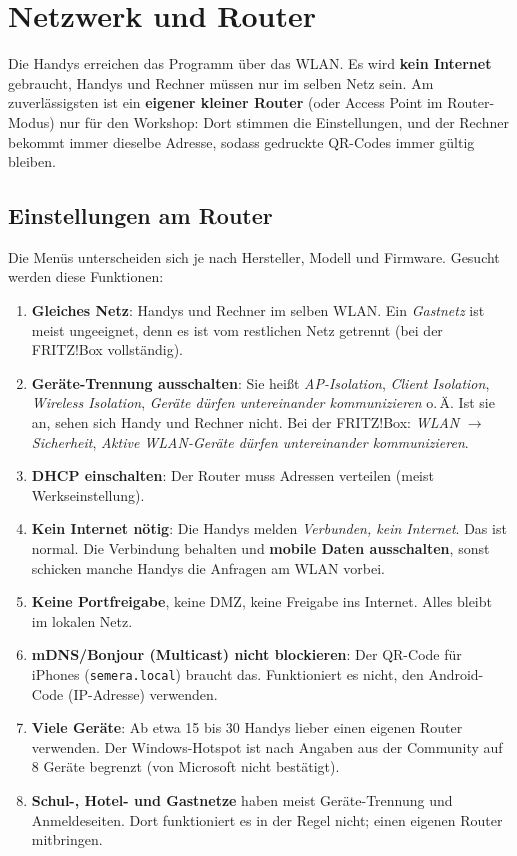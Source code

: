 \documentclass[a4paper,11pt]{article}
\newcommand{\pfeil}{\ensuremath{\rightarrow}}
\begin{document}
\section{Netzwerk und Router}\label{sec:netzwerk}

Die Handys erreichen das Programm über das WLAN. Es wird \textbf{kein Internet} gebraucht, Handys und Rechner müssen nur
im selben Netz sein. Am zuverlässigsten ist ein \textbf{eigener kleiner Router} (oder Access Point im Router-Modus) nur für
den Workshop: Dort stimmen die Einstellungen, und der Rechner bekommt immer dieselbe Adresse, sodass gedruckte
QR-Codes immer gültig bleiben.

\subsection{Einstellungen am Router}

Die Menüs unterscheiden sich je nach Hersteller, Modell und Firmware. Gesucht werden diese Funktionen:
\begin{enumerate}
  \item \textbf{Gleiches Netz}: Handys und Rechner im selben WLAN. Ein \emph{Gastnetz} ist meist ungeeignet, denn es ist
  vom restlichen Netz getrennt (bei der FRITZ!Box vollständig).
  \item \textbf{Geräte-Trennung ausschalten}: Sie heißt \emph{AP-Isolation}, \emph{Client Isolation}, \emph{Wireless
  Isolation}, \emph{Geräte dürfen untereinander kommunizieren} o.\,Ä. Ist sie an, sehen sich Handy und Rechner nicht. Bei
  der FRITZ!Box: \emph{WLAN} \pfeil{} \emph{Sicherheit}, \emph{Aktive WLAN-Geräte dürfen untereinander kommunizieren}.
  \item \textbf{DHCP einschalten}: Der Router muss Adressen verteilen (meist Werkseinstellung).
  \item \textbf{Kein Internet nötig}: Die Handys melden \emph{Verbunden, kein Internet}. Das ist normal. Die Verbindung
  behalten und \textbf{mobile Daten ausschalten}, sonst schicken manche Handys die Anfragen am WLAN vorbei.
  \item \textbf{Keine Portfreigabe}, keine DMZ, keine Freigabe ins Internet. Alles bleibt im lokalen Netz.
  \item \textbf{mDNS/Bonjour (Multicast) nicht blockieren}: Der QR-Code für iPhones (\texttt{semera.local}) braucht das.
  Funktioniert es nicht, den Android-Code (IP-Adresse) verwenden.
  \item \textbf{Viele Geräte}: Ab etwa 15 bis 30 Handys lieber einen eigenen Router verwenden. Der Windows-Hotspot ist
  nach Angaben aus der Community auf 8 Geräte begrenzt (von Microsoft nicht bestätigt).
  \item \textbf{Schul-, Hotel- und Gastnetze} haben meist Geräte-Trennung und Anmeldeseiten. Dort funktioniert es in der
  Regel nicht; einen eigenen Router mitbringen.
\end{enumerate}
\end{document}
